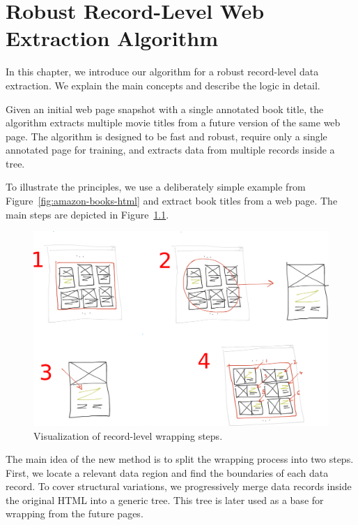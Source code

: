 \chapter{Robust Record-Level Web Extraction Algorithm}
\label{ch:algorithm}

In this chapter, we introduce our algorithm for a robust record-level data extraction. We explain the main concepts and describe the logic in detail.

Given an initial web page snapshot with a single annotated book title, the algorithm extracts multiple movie titles from a future version of the same web page. The algorithm is designed to be fast and robust, require only a single annotated page for training, and extracts data from multiple records inside a tree.

To illustrate the principles, we use a deliberately simple example from Figure~\ref{fig:amazon-books-html} and extract book titles from a web page. The main steps are depicted in Figure~\ref{fig:algorithm}.

\begin{figure}[h]
	\centering
	\includegraphics[width=1.0\textwidth]{figures/algorithm}
	\caption{Visualization of record-level wrapping steps.}
	\label{fig:algorithm}
\end{figure}

The main idea of the new method is to split the wrapping process into two steps. First, we locate a relevant data region and find the boundaries of each data record. To cover structural variations, we progressively merge data records inside the original HTML into a generic tree. This tree is later used as a base for wrapping from the future pages. 

